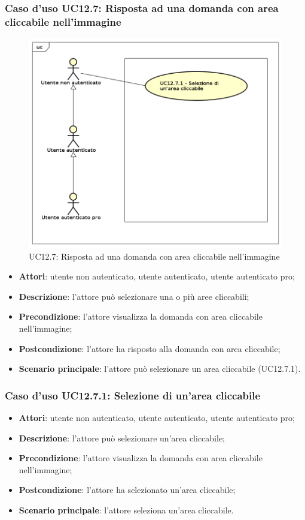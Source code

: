 \subsubsection{Caso d'uso UC12.7: Risposta ad una domanda con area cliccabile nell'immagine}
\label{UC12.7}
\begin{figure}[h]
	\centering
	\includegraphics[scale=0.5]{UML/UC12_7.png}
	\caption{UC12.7: Risposta ad una domanda con area cliccabile nell'immagine}
\end{figure}
\begin{itemize}
\item \textbf{Attori}: utente non autenticato, utente autenticato, utente autenticato pro;
\item \textbf{Descrizione}: l'attore può selezionare una o più aree cliccabili;
\item \textbf{Precondizione}: l'attore visualizza la domanda con area cliccabile nell'immagine;
\item \textbf{Postcondizione}: l'attore ha risposto alla domanda con area cliccabile;
\item \textbf{Scenario principale}: l'attore può selezionare un area cliccabile (UC12.7.1).
\end{itemize}

\subsubsection{Caso d'uso UC12.7.1: Selezione di un'area cliccabile}
\begin{itemize}
\item \textbf{Attori}: utente non autenticato, utente autenticato, utente autenticato pro;
\item \textbf{Descrizione}: l'attore può selezionare un'area cliccabile;
\item \textbf{Precondizione}: l'attore visualizza la domanda con area cliccabile nell'immagine;
\item \textbf{Postcondizione}: l'attore ha selezionato un'area cliccabile;
\item \textbf{Scenario principale}: l'attore seleziona un'area cliccabile.
\end{itemize}
